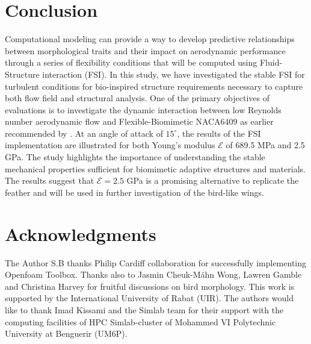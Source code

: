 \documentclass[conf]{new-aiaa}
\begin{document}
\section{Conclusion}
Computational modeling can provide a way to develop predictive relationships between morphological traits and their impact on aerodynamic performance through a series of flexibility conditions that will be computed using Fluid-Structure interaction (FSI).
%
In this study, we have investigated the stable FSI for turbulent conditions for bio-inspired structure requirements necessary to capture both flow field and structural analysis.
%
One of the primary objectives of evaluations is to investigate the dynamic interaction between low Reynolds number aerodynamic flow and Flexible-Biomimetic NACA6409 as earlier recommended by \citet{gamble2020load}.
%
At an angle of attack of $15^{\circ}$, the results of the FSI implementation are illustrated for both Young's modulus $\mathcal{E}$ of 689.5 MPa and 2.5 GPa.
%
The study highlights the importance of understanding the stable mechanical properties sufficient for biomimetic adaptive structures and materials.
%
The results suggest that $\mathcal{E}=2.5$ GPa is a promising alternative to replicate the feather and will be used in further investigation of the bird-like wings.

\section*{Acknowledgments}
The Author S.B thanks Philip Cardiff collaboration for successfully implementing Openfoam Toolbox.
%
Thanks also to Jasmin Cheuk-Máhn Wong, Lawren Gamble and Christina Harvey for fruitful discussions on bird morphology.
%
This work is supported by the International University of Rabat (UIR).
%
The authors would like to thank Imad Kissami and the Simlab team for their support with the computing facilities of HPC Simlab-cluster of Mohammed VI Polytechnic University at Benguerir (UM6P).


\end{document}

